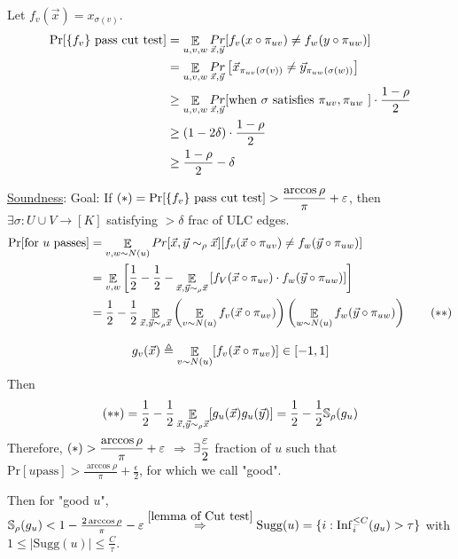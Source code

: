 Let  $ f_v(\vec{x})=x_{\sigma(v)} $.
\[\begin{aligned}
    \mathrm{Pr}[\{f_v\}\text{ pass cut test}]&=\mathop\mathbb E_{u,v,w}\mathop{Pr}_{\vec{x},\vec{y}}[f_v(x\circ\pi_{uv})\neq f_w(y\circ \pi_{uw})]\\
    &=\mathop\mathbb E_{u,v,w}\mathop{Pr}_{\vec{x},\vec{y}}\left[\vec{x}_{\pi_{uv}(\sigma(v))}\neq\vec{y}_{\pi_{uw}(\sigma(w))}\right]\\
    & \geq \mathop\mathbb E_{u,v,w}\mathop{Pr}_{\vec{x},\vec{y}}[\text{when  $ \sigma $ satisfies  $ \pi_{uv},\pi_{uw}$ }]\cdot \frac{1-\rho}{2}\\
    & \geq (1-2\delta)\cdot\frac{1-\rho}{2}\\
    & \geq \frac{1-\rho}{2}-\delta
\end{aligned}\]

\underline{Soundness}: Goal: If  $ (\ast)=\mathrm{Pr}[\{f_v\} \text{ pass cut test}]>\displaystyle\frac{\arccos\rho}{\pi}+\varepsilon $, then  $ \exists \sigma:U\cup V\rightarrow[K] $ satisfying  $ >\delta $ frac of ULC edges.
\begin{align}
    \mathrm{Pr}[\text{for  $ u $ passes}]&=\mathop\mathbb E_{v,w\sim N(u)}\mathop{Pr}[\vec{x},\vec{y}\sim_\rho\vec{x}][f_v(\vec{x}\circ \pi_{uv})\neq f_w(\vec{y}\circ \pi_{uw})]\notag\\
    &=\mathop\mathbb E_{v,w}\left[\frac{1}{2}-\frac{1}{2}-\mathop\mathbb E_{\vec{x},\vec{y}\sim_\rho\vec{x}}\left[f_V(\vec{x}\circ \pi_{uv})\cdot f_{w}(\vec{y}\circ \pi_{uw})\right]\right]\notag\\
    &=\frac{1}{2}-\frac{1}{2}\mathop\mathbb E_{\vec{x},\vec{y}\sim_\rho\vec{x}}\left(\mathop\mathbb E_{v\sim N(u)}f_v(\vec{x}\circ \pi_{uv})\right)\left(\mathop\mathbb E_{w\sim N(u)}f_w(\vec{y}\circ \pi_{uw})\right)\tag{$ \ast\ast $}
\end{align}
\begin{definition}
    \[g_v(\vec{x})\triangleq \mathop\mathbb E_{v\sim N(u)}[f_v(\vec{x}\circ \pi_{uv})]\in [-1,1]\]
    Then 
    \[(\ast\ast)=\frac{1}{2}-\frac{1}{2}\mathop\mathbb E_{\vec{x},\vec{y}\sim _{\rho}\vec{x}}[g_u(\vec{x})g_u(\vec{y})]=\frac{1}2-\frac12{\mathbb S}_\rho(g_u)\]
    Therefore,
    $(\ast)>\displaystyle\frac{\arccos\rho}{\pi}+\varepsilon  $ $ \Rightarrow  $  $ \exists \displaystyle\frac{\varepsilon}{2} $ fraction of  $ u $ such that  $ \mathrm{Pr}[u \text{pass}]>\frac{\arccos\rho}{\pi}+\frac{\epsilon}{2} $, for which we call "good".
    
    Then for "good  $ u $",  $ {\mathbb S}_\rho(g_u)<1-\frac{2\arccos\rho}{\pi}-\varepsilon\overset{\ref{lemma of Cut test}}{\Rightarrow}   \mathrm{Sugg}(u)=\{i:\mathrm{Inf}_{i}^{ \leq C}(g_u)>\tau\} $ with  $ 1 \leq |\mathrm{Sugg}(u)| \leq \frac{C}{\tau} $.   
\end{definition}


